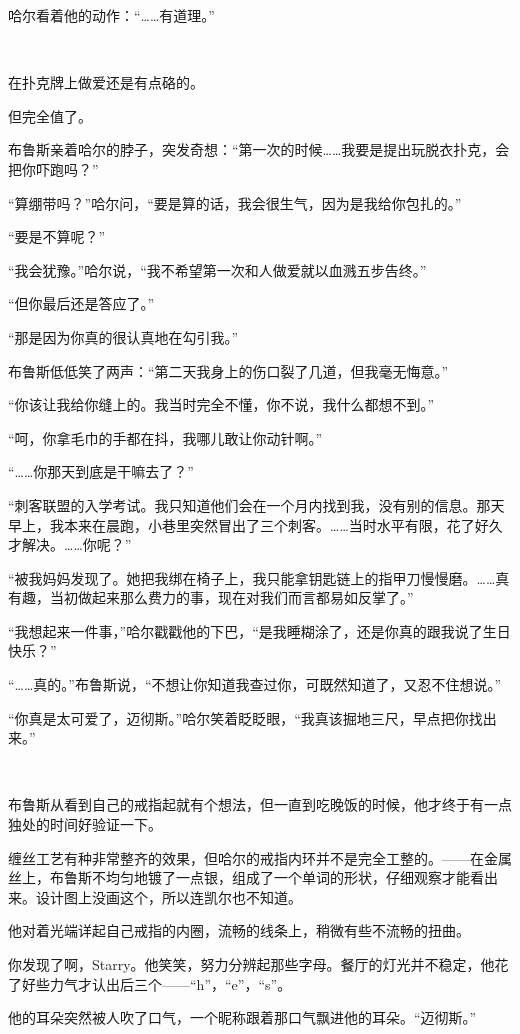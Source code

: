 \documentclass[../main]{subfiles}
\begin{document}
哈尔看着他的动作：“……有道理。”

~\

在扑克牌上做爱还是有点硌的。

但完全值了。

布鲁斯亲着哈尔的脖子，突发奇想：“第一次的时候……我要是提出玩脱衣扑克，会把你吓跑吗？”

“算绷带吗？”哈尔问，“要是算的话，我会很生气，因为是我给你包扎的。”

“要是不算呢？”

“我会犹豫。”哈尔说，“我不希望第一次和人做爱就以血溅五步告终。”

“但你最后还是答应了。”

“那是因为你真的很认真地在勾引我。”

布鲁斯低低笑了两声：“第二天我身上的伤口裂了几道，但我毫无悔意。”

“你该让我给你缝上的。我当时完全不懂，你不说，我什么都想不到。”

“呵，你拿毛巾的手都在抖，我哪儿敢让你动针啊。”

“……你那天到底是干嘛去了？”

“刺客联盟的入学考试。我只知道他们会在一个月内找到我，没有别的信息。那天早上，我本来在晨跑，小巷里突然冒出了三个刺客。……当时水平有限，花了好久才解决。……你呢？”

“被我妈妈发现了。她把我绑在椅子上，我只能拿钥匙链上的指甲刀慢慢磨。……真有趣，当初做起来那么费力的事，现在对我们而言都易如反掌了。”

“我想起来一件事，”哈尔戳戳他的下巴，“是我睡糊涂了，还是你真的跟我说了生日快乐？”

“……真的。”布鲁斯说，“不想让你知道我查过你，可既然知道了，又忍不住想说。”

“你真是太可爱了，迈彻斯。”哈尔笑着眨眨眼，“我真该掘地三尺，早点把你找出来。”

~\

布鲁斯从看到自己的戒指起就有个想法，但一直到吃晚饭的时候，他才终于有一点独处的时间好验证一下。

缠丝工艺有种非常整齐的效果，但哈尔的戒指内环并不是完全工整的。——在金属丝上，布鲁斯不均匀地镀了一点银，组成了一个单词的形状，仔细观察才能看出来。设计图上没画这个，所以连凯尔也不知道。

他对着光端详起自己戒指的内圈，流畅的线条上，稍微有些不流畅的扭曲。

你发现了啊，Starry。他笑笑，努力分辨起那些字母。餐厅的灯光并不稳定，他花了好些力气才认出后三个——“h”，“e”，“s”。

他的耳朵突然被人吹了口气，一个昵称跟着那口气飘进他的耳朵。“迈彻斯。”
\end{document}
